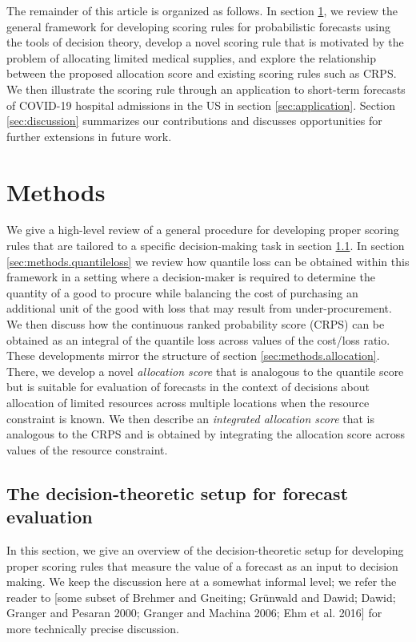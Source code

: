 \documentclass{article}
\begin{document}
The remainder of this article is organized as follows. In section \ref{sec:methods}, we review the general framework for developing scoring rules for probabilistic forecasts using the tools of decision theory, develop a novel scoring rule that is motivated by the problem of allocating limited medical supplies, and explore the relationship between the proposed allocation score and existing scoring rules such as CRPS. We then illustrate the scoring rule through an application to short-term forecasts of COVID-19 hospital admissions in the US in section \ref{sec:application}. Section \ref{sec:discussion} summarizes our contributions and discusses opportunities for further extensions in future work.

\section{Methods}
\label{sec:methods}

We give a high-level review of a general procedure for developing proper scoring rules that are tailored to a specific decision-making task in section \ref{sec:methods.decisiontheory}. In section \ref{sec:methods.quantileloss} we review how quantile loss can be obtained within this framework in a setting where a decision-maker is required to determine the quantity of a good to procure while balancing the cost of purchasing an additional unit of the good with loss that may result from under-procurement. We then discuss how the continuous ranked probability score (CRPS) can be obtained as an integral of the quantile loss across values of the cost/loss ratio. These developments mirror the structure of section \ref{sec:methods.allocation}. There, we develop a novel \emph{allocation score} that is analogous to the quantile score but is suitable for evaluation of forecasts in the context of decisions about allocation of limited resources across multiple locations when the resource constraint is known. We then describe an \emph{integrated allocation score} that is analogous to the CRPS and is obtained by integrating the allocation score across values of the resource constraint.

\subsection{The decision-theoretic setup for forecast evaluation}
\label{sec:methods.decisiontheory}

In this section, we give an overview of the decision-theoretic setup for developing proper scoring rules that measure the value of a forecast as an input to decision making. We keep the discussion here at a somewhat informal level; we refer the reader to [some subset of Brehmer and Gneiting; Grünwald and Dawid; Dawid; Granger and Pesaran 2000; Granger and Machina 2006; Ehm et al. 2016] for more technically precise discussion.
\end{document}
